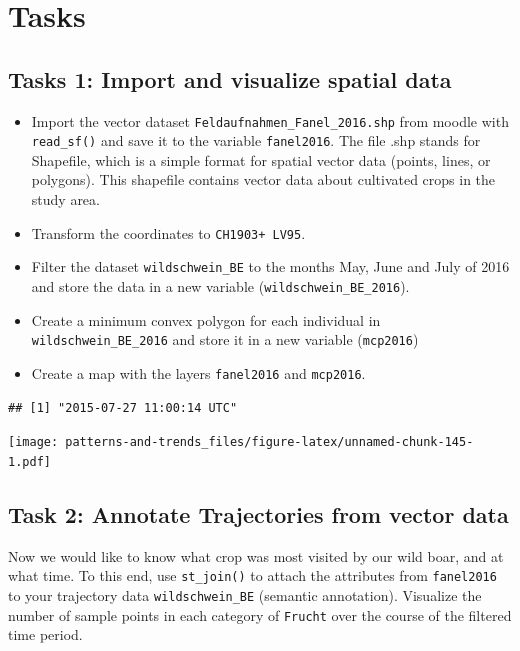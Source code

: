 \documentclass[]{book}
\providecommand{\tightlist}{%
  \setlength{\itemsep}{0pt}\setlength{\parskip}{0pt}}
\begin{document}
\hypertarget{tasks}{%
\section{Tasks}\label{tasks}}

\hypertarget{tasks-1-import-and-visualize-spatial-data}{%
\subsection{Tasks 1: Import and visualize spatial data}\label{tasks-1-import-and-visualize-spatial-data}}

\begin{itemize}
\tightlist
\item
  Import the vector dataset \texttt{Feldaufnahmen\_Fanel\_2016.shp} from moodle with \texttt{read\_sf()} and save it to the variable \texttt{fanel2016}. The file .shp stands for Shapefile, which is a simple format for spatial vector data (points, lines, or polygons). This shapefile contains vector data about cultivated crops in the study area.
\item
  Transform the coordinates to \texttt{CH1903+\ LV95}.
\item
  Filter the dataset \texttt{wildschwein\_BE} to the months May, June and July of 2016 and store the data in a new variable (\texttt{wildschwein\_BE\_2016}).
\item
  Create a minimum convex polygon for each individual in \texttt{wildschwein\_BE\_2016} and store it in a new variable (\texttt{mcp2016})
\item
  Create a map with the layers \texttt{fanel2016} and \texttt{mcp2016}.
\end{itemize}

\begin{verbatim}
## [1] "2015-07-27 11:00:14 UTC"
\end{verbatim}

\texttt{[image: patterns-and-trends\_files/figure-latex/unnamed-chunk-145-1.pdf]}

\hypertarget{task-2-annotate-trajectories-from-vector-data}{%
\subsection{Task 2: Annotate Trajectories from vector data}\label{task-2-annotate-trajectories-from-vector-data}}

Now we would like to know what crop was most visited by our wild boar, and at what time. To this end, use \texttt{st\_join()} to attach the attributes from \texttt{fanel2016} to your trajectory data \texttt{wildschwein\_BE} (semantic annotation). Visualize the number of sample points in each category of \texttt{Frucht} over the course of the filtered time period.
\end{document}

